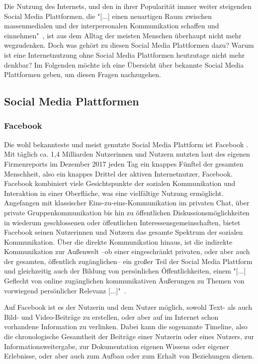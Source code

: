 Die Nutzung des Internets, und den in ihrer Popularität immer weiter steigenden Social Media Plattformen, die "[...] einen neuartigen Raum zwischen massenmedialen und der interpersonalen Kommunikation schaffen und einnehmen"\  \cite{schmidt2018einstieg}, ist aus dem Alltag der meisten Menschen überhaupt nicht mehr wegzudenken. Doch was gehört zu diesen Social Media Plattformen dazu? Warum ist eine Internetnutzung ohne Social Media Plattformen heutzutage nicht mehr denkbar? Im Folgenden möchte ich eine Übersicht über bekannte Social Media Plattformen geben, um diesen Fragen nachzugehen.

\subsection{Social Media Plattformen}

\subsubsection{Facebook}

Die wohl bekannteste und meist genutzte Social Media Plattform ist Facebook \faFacebook. Mit täglich ca. 1,4 Milliarden Nutzerinnen und Nutzern \cite{facebookfinancials} nutzten laut des eigenen Firmenreports im Dezember 2017 jeden Tag ein knappes Fünftel der gesamten Menschheit, also ein knappes Drittel der aktiven Internetnutzer, Facebook. Facebook kombiniert viele Gesichtspunkte der sozialen Kommunikation und Interaktion in einer Oberfläche, was eine vielfältige Nutzung ermöglicht. Angefangen mit klassischer Eins-zu-eins-Kommunikation im privaten Chat, über private Gruppenkommunikation bis hin zu öffentlichen Diskussionsmöglichkeiten in wiederum geschlossenen oder öffentlichen Interessensgemeinschaften, bietet Facebook seinen Nutzerinnen und Nutzern das gesamte Spektrum der sozialen Kommunikation. Über die direkte Kommunikation hinaus, ist die indirekte Kommunikation zur Außenwelt --ob einer eingeschränkt privaten, oder aber auch der gesamten, öffentlich zugänglichen-- ein großer Teil der Social Media Plattform und gleichzeitig auch der Bildung von persönlichen Öffentlichkeiten, einem "[...] Geflecht von online zugänglichen kommunikativen Äußerungen zu Themen von vorwiegend persönlicher Relevanz [...]"\ \cite{schmidt2009netz}.

Auf Facebook ist es der Nutzerin und dem Nutzer möglich, sowohl Text- als auch Bild- und Video-Beiträge zu erstellen, oder aber auf im Internet schon vorhandene Information zu verlinken. Dabei kann die sogenannte Timeline, also die chronologische Gesamtheit der Beiträge einer Nutzerin oder eines Nutzers, zur Informationsweitergabe, zur Dokumentation eigenen Wissens oder eigener Erlebnisse, oder aber auch zum Aufbau oder zum Erhalt von Beziehungen dienen.

